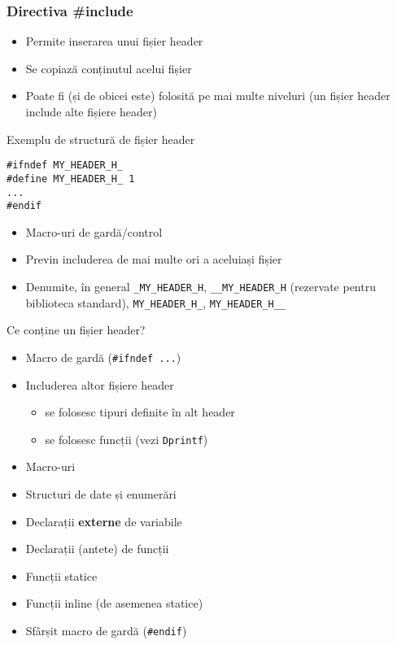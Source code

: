 \documentclass{beamer}
\begin{document}
\frame{\tableofcontents[currentsection]}

\begin{frame}
	\frametitle{Directiva \#include}
	\begin{itemize}
		\item Permite inserarea unui fișier header
		\item Se copiază conținutul acelui fișier
		\item Poate fi (și de obicei este) folosită pe mai multe niveluri (un
fișier header include alte fișiere header)
	\end{itemize}
\end{frame}

\begin{frame}{Exemplu de structură de fișier header}
	\begin{beamerboxesrounded}[lower=block body,shadow=true]{}
		\texttt{\#ifndef MY\_HEADER\_H\_ \\
\#define MY\_HEADER\_H\_	1 \\
... \\
\#endif \\
}
	\end{beamerboxesrounded}
	\begin{itemize}
		\item Macro-uri de gardă/control
		\item Previn includerea de mai multe ori a aceluiași fișier
		\item Denumite, în general \texttt{\_MY\_HEADER\_H},
\texttt{\_\_MY\_HEADER\_H} (rezervate pentru biblioteca standard),
\texttt{MY\_HEADER\_H\_}, \texttt{MY\_HEADER\_H\_\_}
	\end{itemize}
\end{frame}

\begin{frame}{Ce conține un fișier header?}
	\begin{itemize}
		\item Macro de gardă (\texttt{\#ifndef ...})
		\item Includerea altor fișiere header
			\begin{itemize}
				\item se folosesc tipuri definite în alt header
				\item se folosesc funcții (vezi \texttt{Dprintf})
			\end{itemize}
		\item Macro-uri
		\item Structuri de date și enumerări
		\item Declarații \textbf{externe} de variabile
		\item Declarații (antete) de funcții
		\item Funcții statice
		\item Funcții inline (de asemenea statice)
		\item Sfârșit macro de gardă (\texttt{\#endif})
	\end{itemize}
\end{frame}
\end{document}
